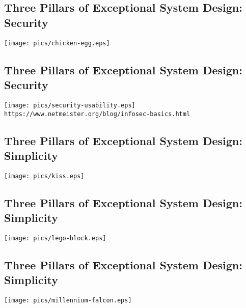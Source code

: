 \documentclass[xga]{xdvislides}
\begin{document}
\subsection{Three Pillars of Exceptional System Design: Security}
\vspace*{\fill}
\begin{center}
    \texttt{[image: pics/chicken-egg.eps]} \\
\end{center}
\vspace*{\fill}

\subsection{Three Pillars of Exceptional System Design: Security}
\vspace*{\fill}
\begin{center}
    \texttt{[image: pics/security-usability.eps]} \\
	\small
	{\tt https://www.netmeister.org/blog/infosec-basics.html}
	\Normalsize
\end{center}
\vspace*{\fill}

\subsection{Three Pillars of Exceptional System Design: Simplicity}
\vspace*{\fill}
\begin{center}
    \texttt{[image: pics/kiss.eps]} \\
\end{center}
\vspace*{\fill}

\subsection{Three Pillars of Exceptional System Design: Simplicity}
\vspace*{\fill}
\begin{center}
    \texttt{[image: pics/lego-block.eps]}
\end{center}
\vspace*{\fill}

\subsection{Three Pillars of Exceptional System Design: Simplicity}
\vspace*{\fill}
\begin{center}
    \texttt{[image: pics/millennium-falcon.eps]} \\
\end{center}
\vspace*{\fill}
\end{document}
